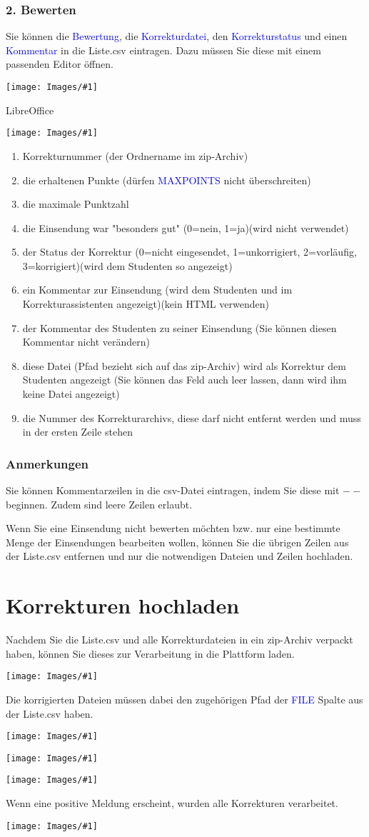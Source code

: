 \documentclass[a4paper,final, parskip]{scrartcl}
\numberwithin{equation}{section}
\newcommand{\blau}[1]{\textcolor{blue}{#1}}
\newenvironment{Bilder}
  {\par\raggedbottom\null\noindent\minipage{\textwidth}\centering}
  {\endminipage\vspace{0.7cm}}
\newcommand{\tbild}[1]{
\begin{Bilder}
 \texttt{[image: Images/\#1]}
	\end{Bilder}
}
\newcommand{\gbild}[2]{
\begin{Bilder}	
    \centering
	\begin{minipage}{\linewidth}
    \centering
       \texttt{[image: Images/\#1]}
  \end{minipage}
    #2
	\end{Bilder}
}
\begin{document}
\newpage
\subsubsection*{2. Bewerten}
Sie können die \blau{Bewertung}, die \blau{Korrekturdatei}, den \blau{Korrekturstatus} und einen \blau{Kommentar} in die Liste.csv eintragen. Dazu müssen Sie diese mit einem passenden Editor öffnen. 

\gbild{libreA.png}{LibreOffice}

\tbild{libreB.png}
\begin{enumerate}
\item Korrekturnummer (der Ordnername im zip-Archiv)
\item die erhaltenen Punkte (dürfen \blau{MAXPOINTS} nicht überschreiten)
\item die maximale Punktzahl
\item die Einsendung war "besonders gut" (0=nein, 1=ja)(wird nicht verwendet)
\item der Status der Korrektur (0=nicht eingesendet, 1=unkorrigiert, 2=vorläufig, 3=korrigiert)(wird dem Studenten so angezeigt)
\item ein Kommentar zur Einsendung (wird dem Studenten und im Korrekturassistenten angezeigt)(kein HTML verwenden)
\item der Kommentar des Studenten zu seiner Einsendung (Sie können diesen Kommentar nicht verändern)
\item diese Datei (Pfad bezieht sich auf das zip-Archiv) wird als Korrektur dem Studenten angezeigt (Sie können das Feld auch leer lassen, dann wird ihm keine Datei angezeigt)
\item die Nummer des Korrekturarchivs, diese darf nicht entfernt werden und muss in der ersten Zeile stehen
\end{enumerate}

\subsubsection*{Anmerkungen}
Sie können Kommentarzeilen in die csv-Datei eintragen, indem Sie diese mit $--$ beginnen. Zudem sind leere Zeilen erlaubt.

Wenn Sie eine Einsendung nicht bewerten möchten bzw. nur eine bestimmte Menge der Einsendungen bearbeiten wollen, können Sie die übrigen Zeilen aus der Liste.csv entfernen und nur die notwendigen Dateien und Zeilen hochladen. 

\newpage
\section{Korrekturen hochladen}
Nachdem Sie die Liste.csv und alle Korrekturdateien in ein zip-Archiv verpackt haben, können Sie dieses zur Verarbeitung in die Plattform laden. 

\tbild{sampleD.png}

Die korrigierten Dateien müssen dabei den zugehörigen Pfad der \blau{FILE} Spalte aus der Liste.csv haben.

\tbild{uploadA.png}
\tbild{uploadB.png}
\tbild{uploadC.png}

Wenn eine positive Meldung erscheint, wurden alle Korrekturen verarbeitet.
\tbild{uploadD.png}
\end{document}
